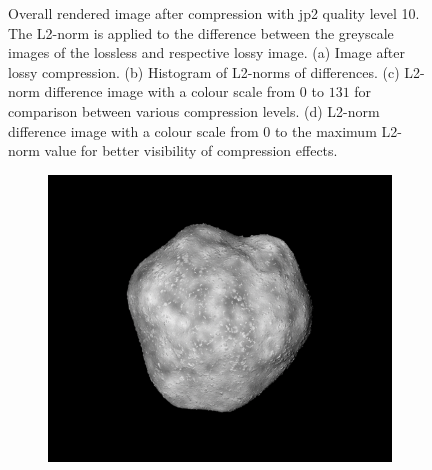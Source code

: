 \begin{figure}[htb]
\begin{subfigure}[b]{0.48\textwidth}
        \caption{}
        \label{fig:img_quality_comp_jp2_10_diff_rel}
    \end{subfigure}
    \caption{Overall rendered image after compression with \gls{jp2} quality level 10. The L2-norm is applied to the difference between the greyscale images of the lossless and respective lossy image. (a) Image after lossy compression. (b) Histogram of L2-norms of differences. (c) L2-norm difference image with a colour scale from $0$ to $131$ for comparison between various compression levels. (d) L2-norm difference image with a colour scale from $0$ to the maximum L2-norm value for better visibility of compression effects.}
    \label{fig:img_quality_comp_jp2_10}
\end{figure}

\begin{figure}[htb]
    \centering
    \begin{subfigure}[b]{0.48\textwidth}
        \centering
        \includegraphics[width=\textwidth]{doc/thesis/0_figures/compare_quality/set1/jp2_100}
        \caption{}
        \label{fig:img_quality_comp_jp2_100_orig}
    \end{subfigure}
    \begin{subfigure}[b]{0.48\textwidth}
        \centering

\end{subfigure}
\end{figure}
